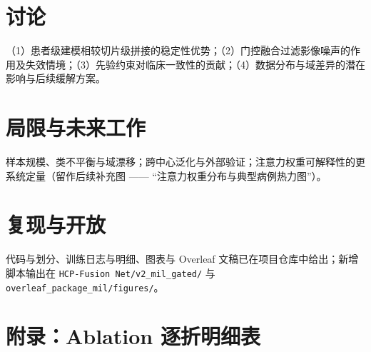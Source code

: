 \documentclass[12pt,a4paper]{ctexart}
\begin{document}
\section{讨论}
（1）患者级建模相较切片级拼接的稳定性优势；（2）门控融合过滤影像噪声的作用及失效情境；（3）先验约束对临床一致性的贡献；（4）数据分布与域差异的潜在影响与后续缓解方案。

\section{局限与未来工作}
样本规模、类不平衡与域漂移；跨中心泛化与外部验证；注意力权重可解释性的更系统定量（留作后续补充图 —— “注意力权重分布与典型病例热力图”）。

\section{复现与开放}
代码与划分、训练日志与明细、图表与 Overleaf 文稿已在项目仓库中给出；新增脚本输出在 \texttt{HCP-Fusion Net/v2\_mil\_gated/} 与 \texttt{overleaf\_package\_mil/figures/}。

\appendix
\section{附录：Ablation 逐折明细表}






\end{document}

